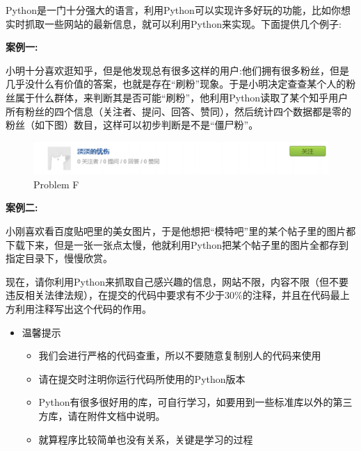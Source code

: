 \documentclass[12pt,a4paper]{article}
\begin{document}
\newpage
{}
\begin{ACEEproblem}{1.4}{\xiaosihao}{\youyuan}
Python是一门十分强大的语言，利用Python可以实现许多好玩的功能，比如你想实时抓取一些网站的最新信息，就可以利用Python来实现。下面提供几个例子:\par
{\bf{案例一:}}\par
小明十分喜欢逛知乎，但是他发现总有很多这样的用户:他们拥有很多粉丝，但是几乎没什么有价值的答案，也就是存在``刷粉''现象。于是小明决定查查某个人的粉丝属于什么群体，来判断其是否可能``刷粉''，他利用Python读取了某个知乎用户所有粉丝的四个信息（关注者、提问、回答、赞同），然后统计四个数据都是零的粉丝（如下图）数目，这样可以初步判断是不是``僵尸粉''。\par
\begin{figure}[H]
\small
\centering
\includegraphics[width=12cm]{fig11.png}
\caption{Problem F}
\end{figure} 
{\bf{案例二:}}\par
小刚喜欢看百度贴吧里的美女图片，于是他想把``模特吧''里的某个帖子里的图片都下载下来，但是一张一张点太慢，他就利用Python把某个帖子里的图片全都存到指定目录下，慢慢欣赏。\par
\vspace*{4pt}
现在，请你利用Python来抓取自己感兴趣的信息，网站不限，内容不限（但不要违反相关法律法规），在提交的代码中要求有不少于30\%的注释，并且在代码最上方利用注释写出这个代码的作用。\par
\vspace*{4pt}

\begin{itemize}
	\item 温馨提示
	\begin{itemize}
		\item[1.] 我们会进行严格的代码查重，所以不要随意复制别人的代码来使用
		\item[2.] 请在提交时注明你运行代码所使用的Python版本
		\item[3.] Python有很多很好用的库，可自行学习，如要用到一些标准库以外的第三方库，请在附件文档中说明。
		\item[4.] 就算程序比较简单也没有关系，关键是学习的过程
	\end{itemize}
\end{itemize}
\end{ACEEproblem}
\end{document}
